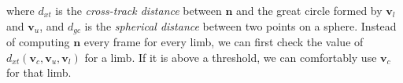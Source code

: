 where $d_{xt}$ is the \textit{cross-track distance} between $\mathbf{n}$ and the great circle formed by $\mathbf{v}_l$ and $\mathbf{v}_u$,
and $d_{gc}$ is the \textit{spherical distance} between two points on a sphere.
Instead of computing $\mathbf{n}$ every frame for every limb, we can first check the value of $d_{xt}(\mathbf{v}_c, \mathbf{v}_u, \mathbf{v}_l)$ for a limb. If it is above a threshold, we can comfortably use $\mathbf{v}_c$ for that limb.


















